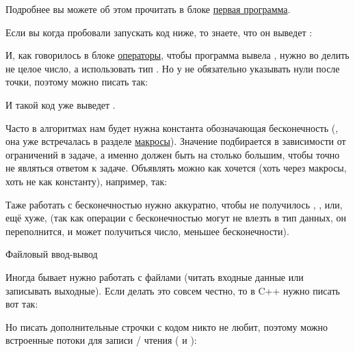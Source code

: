 Подробнее вы можете об этом прочитать в блоке \hyperlink{1.1}{первая программа}.


\startspace
{}
\endspace

Если вы когда пробовали запускать код ниже, то знаете, что он выведет :


И, как говорилось в блоке \hyperlink{1.3}{операторы}, чтобы программа вывела , нужно во делить не целое число, а использовать тип . Но у  не обязательно указывать нули после точки, поэтому можно писать так:


И такой код уже выведет .


\startspace
{}
\endspace

Часто в алгоритмах нам будет нужна константа обозначающая бесконечность (, она уже встречалась в разделе \hyperlink{macros}{макросы}). Значение  подбирается в зависимости от ограничений в задаче, а именно  должен быть на столько большим, чтобы точно не являться ответом к задаче. Объявлять  можно как хочется (хоть через макросы, хоть не как константу), например, так:


Таже работать с бесконечностью нужно аккуратно, чтобы не получилось , , или, ещё хуже,  (так как операции с бесконечностью могут не влезть в тип данных, он переполнится, и может получиться число, меньшее бесконечности).


\startspace
Файловый ввод-вывод
\endspace

Иногда бывает нужно работать с файлами (читать входные данные или записывать выходные). Если делать это совсем честно, то в C++ нужно писать вот так:


Но писать дополнительные строчки с кодом никто не любит, поэтому можно  встроенные потоки для записи / чтения ( и ):







